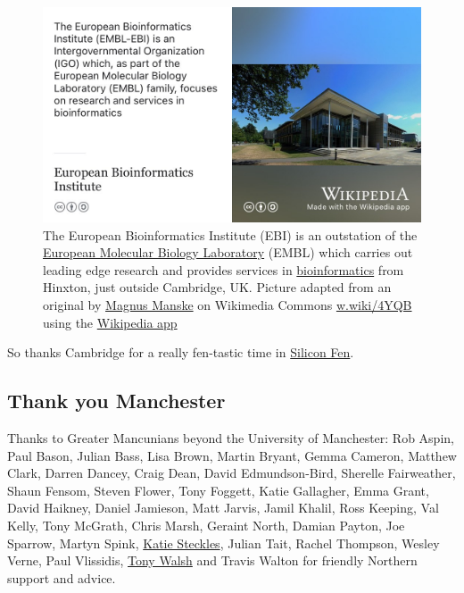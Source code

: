 \documentclass[
]{book}
\begin{document}
\begin{figure}

{\centering \includegraphics[width=1\linewidth]{images/european-bioinformatics-institute} 

}

\caption{The European Bioinformatics Institute (EBI) is an outstation of the \href{https://en.wikipedia.org/wiki/European_Molecular_Biology_Laboratory}{European Molecular Biology Laboratory} (EMBL) which carries out leading edge research and provides services in \href{https://en.wikipedia.org/wiki/Bioinformatics}{bioinformatics} from Hinxton, just outside Cambridge, UK. Picture adapted from an original by \href{https://en.wikipedia.org/wiki/Magnus_Manske}{Magnus Manske} on Wikimedia Commons \href{https://w.wiki/4YQB}{w.wiki/4YQB} using the \href{https://apps.apple.com/us/app/wikipedia/id324715238}{Wikipedia app}}\label{fig:cambridge-fig}
\end{figure}



So thanks Cambridge for a really fen-tastic time in \href{https://en.wikipedia.org/wiki/Silicon_Fen}{Silicon Fen}. 🙏

\hypertarget{manchester}{%
\subsection{Thank you Manchester}\label{manchester}}

Thanks to Greater Mancunians beyond the University of Manchester: Rob Aspin, Paul Bason, Julian Bass, Lisa Brown, Martin Bryant, Gemma Cameron, Matthew Clark, Darren Dancey, Craig Dean, David Edmundson-Bird, Sherelle Fairweather, Shaun Fensom, Steven Flower, Tony Foggett, Katie Gallagher, Emma Grant, David Haikney, Daniel Jamieson, Matt Jarvis, Jamil Khalil, Ross Keeping, Val Kelly, Tony McGrath, Chris Marsh, Geraint North, Damian Payton, Joe Sparrow, Martyn Spink, \href{https://www.katiesteckles.co.uk/}{Katie Steckles}, Julian Tait, Rachel Thompson, Wesley Verne, Paul Vlissidis, \href{https://en.wikipedia.org/wiki/Tony_Walsh_(poet)}{Tony Walsh} and Travis Walton for friendly Northern support and advice.
\end{document}
